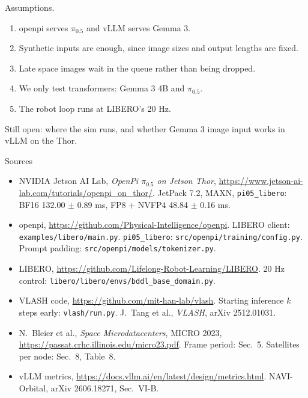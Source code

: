 \documentclass[11pt,aspectratio=43]{beamer}
\begin{document}
\begin{frame}{Assumptions.}

\vspace{0.2cm}
\small
\begin{enumerate}
  \setlength{\itemsep}{0.6em}
  \item openpi serves $\pi_{0.5}$ and vLLM serves Gemma 3.
  \item Synthetic inputs are enough, since image sizes and output lengths are fixed.
  \item Late space images wait in the queue rather than being dropped.
  \item We only test transformers: Gemma 3 4B and $\pi_{0.5}$.
  \item The robot loop runs at LIBERO's 20 Hz.
\end{enumerate}

\vspace{0.5cm}
Still open: where the sim runs, and whether Gemma 3 image input works in vLLM on the Thor.

\end{frame}


\begin{frame}[shrink=10]{Sources}
\scriptsize
\begin{itemize}
  \setlength{\itemsep}{0.45em}
  \item NVIDIA Jetson AI Lab, \emph{OpenPi $\pi_{0.5}$ on Jetson Thor}, \url{https://www.jetson-ai-lab.com/tutorials/openpi_on_thor/}. JetPack 7.2, MAXN, \texttt{pi05\_libero}: BF16 132.00 $\pm$ 0.89 ms, FP8 + NVFP4 48.84 $\pm$ 0.16 ms.
  \item openpi, \url{https://github.com/Physical-Intelligence/openpi}. LIBERO client: \texttt{examples/libero/main.py}. \texttt{pi05\_libero}: \texttt{src/openpi/training/config.py}. Prompt padding: \texttt{src/openpi/models/tokenizer.py}.
  \item LIBERO, \url{https://github.com/Lifelong-Robot-Learning/LIBERO}. 20 Hz control: \texttt{libero/libero/envs/bddl\_base\_domain.py}.
  \item VLASH code, \url{https://github.com/mit-han-lab/vlash}. Starting inference $k$ steps early: \texttt{vlash/run.py}. J.~Tang et al., \emph{VLASH}, arXiv 2512.01031.
  \item N.~Bleier et al., \emph{Space Microdatacenters}, MICRO 2023, \url{https://passat.crhc.illinois.edu/micro23.pdf}. Frame period: Sec.~5. Satellites per node: Sec.~8, Table~8.
  \item vLLM metrics, \url{https://docs.vllm.ai/en/latest/design/metrics.html}. NAVI-Orbital, arXiv 2606.18271, Sec.~VI-B.
\end{itemize}
\end{frame}
\end{document}
